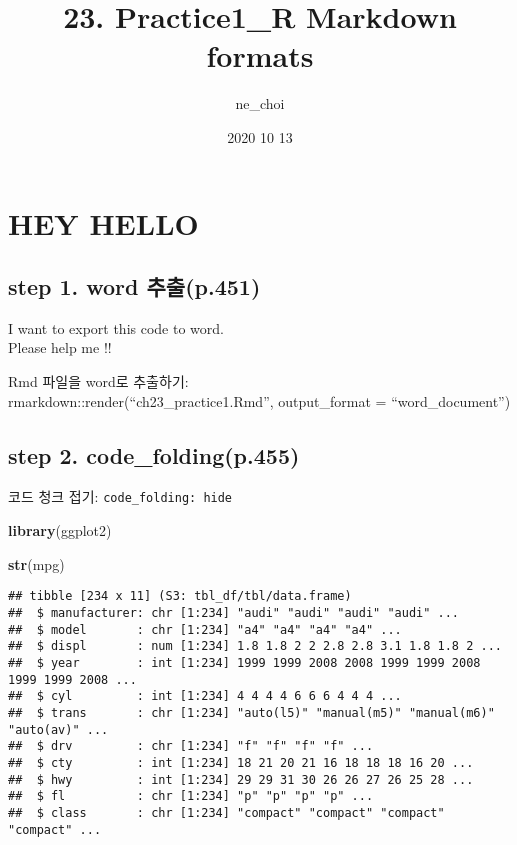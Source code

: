 \documentclass[
]{article}
\title{23. Practice1\_R Markdown formats}
\author{ne\_choi}
\date{2020 10 13}
\newenvironment{Shaded}{\begin{snugshade}}{\end{snugshade}}
\newcommand{\KeywordTok}[1]{\textcolor[rgb]{0.13,0.29,0.53}{\textbf{#1}}}
\newcommand{\NormalTok}[1]{#1}
\begin{document}
\maketitle

\hypertarget{hey-hello}{%
\section{HEY HELLO}\label{hey-hello}}

\hypertarget{step-1.-word-uxcd94uxcd9cp.451}{%
\subsection{step 1. word
추출(p.451)}\label{step-1.-word-uxcd94uxcd9cp.451}}

I want to export this code to word.\\
Please help me !!

Rmd 파일을 word로 추출하기:\\
rmarkdown::render(``ch23\_practice1.Rmd'', output\_format =
``word\_document'')

\hypertarget{step-2.-code_foldingp.455}{%
\subsection{step 2.
code\_folding(p.455)}\label{step-2.-code_foldingp.455}}

코드 청크 접기: \texttt{code\_folding:\ hide}

\begin{Shaded}
\begin{Highlighting}[]
\KeywordTok{library}\NormalTok{(ggplot2)}

\KeywordTok{str}\NormalTok{(mpg)}
\end{Highlighting}
\end{Shaded}

\begin{verbatim}
## tibble [234 x 11] (S3: tbl_df/tbl/data.frame)
##  $ manufacturer: chr [1:234] "audi" "audi" "audi" "audi" ...
##  $ model       : chr [1:234] "a4" "a4" "a4" "a4" ...
##  $ displ       : num [1:234] 1.8 1.8 2 2 2.8 2.8 3.1 1.8 1.8 2 ...
##  $ year        : int [1:234] 1999 1999 2008 2008 1999 1999 2008 1999 1999 2008 ...
##  $ cyl         : int [1:234] 4 4 4 4 6 6 6 4 4 4 ...
##  $ trans       : chr [1:234] "auto(l5)" "manual(m5)" "manual(m6)" "auto(av)" ...
##  $ drv         : chr [1:234] "f" "f" "f" "f" ...
##  $ cty         : int [1:234] 18 21 20 21 16 18 18 18 16 20 ...
##  $ hwy         : int [1:234] 29 29 31 30 26 26 27 26 25 28 ...
##  $ fl          : chr [1:234] "p" "p" "p" "p" ...
##  $ class       : chr [1:234] "compact" "compact" "compact" "compact" ...
\end{verbatim}
\end{document}
